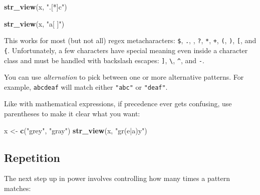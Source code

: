 \documentclass[
]{book}
\newenvironment{Shaded}{\begin{snugshade}}{\end{snugshade}}
\newcommand{\KeywordTok}[1]{\textcolor[rgb]{0.13,0.29,0.53}{\textbf{#1}}}
\newcommand{\NormalTok}[1]{#1}
\newcommand{\StringTok}[1]{\textcolor[rgb]{0.31,0.60,0.02}{#1}}
\begin{document}
\hypertarget{htmlwidget-4018eef1a407a0df6b52}{}

\begin{Shaded}
\begin{Highlighting}[]
\KeywordTok{str_view}\NormalTok{(x, }\StringTok{".[*]c"}\NormalTok{)}
\end{Highlighting}
\end{Shaded}

\hypertarget{htmlwidget-5b1b2f4ad92281566982}{}

\begin{Shaded}
\begin{Highlighting}[]
\KeywordTok{str_view}\NormalTok{(x, }\StringTok{"a[ ]"}\NormalTok{)}
\end{Highlighting}
\end{Shaded}

\hypertarget{htmlwidget-25c3e940e6859592f801}{}

This works for most (but not all) regex metacharacters: \texttt{\$}, \texttt{.}, \texttt{\textbar{}}, \texttt{?}, \texttt{*}, \texttt{+}, \texttt{(}, \texttt{)}, \texttt{{[}}, and \texttt{\{}. Unfortunately, a few characters have special meaning even inside a character class and must be handled with backslash escapes: \texttt{{]}}, \texttt{\textbackslash{}}, \texttt{\^{}}, and \texttt{-}.

You can use \emph{alternation} to pick between one or more alternative patterns. For example, \texttt{abc\textbar{}deaf} will match either \texttt{"abc"} or \texttt{"deaf"}.

Like with mathematical expressions, if precedence ever gets confusing, use parentheses to make it clear what you want:

\begin{Shaded}
\begin{Highlighting}[]
\NormalTok{x <-}\StringTok{ }\KeywordTok{c}\NormalTok{(}\StringTok{"grey"}\NormalTok{, }\StringTok{"gray"}\NormalTok{)}
\KeywordTok{str_view}\NormalTok{(x, }\StringTok{"gr(e|a)y"}\NormalTok{)}
\end{Highlighting}
\end{Shaded}

\hypertarget{htmlwidget-3f27c09be0c60bb52829}{}

\hypertarget{repetition}{%
\subsection{Repetition}\label{repetition}}

The next step up in power involves controlling how many times a pattern matches:
\end{document}

